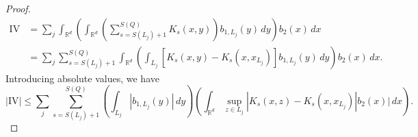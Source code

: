 \documentclass[12pt]{amsart}
\newcommand{\R}{\mathbb{R}}
\theoremstyle{plain}
\theoremstyle{definition} %
\numberwithin{equation}{section}
\begin{document}
\begin{proof}
    \begin{align*}    
    \mathrm{IV}
    &=   
    \sum_j \int_{\R^d}\left(\int_{\R^d}\left(
    \sum_{s=S(L_j)+1}^{S(Q)} K_s(x,y)
    \right)b_{1,L_j}(y)\, dy\right) b_2(x)\, dx
    \\&=
    \sum_{j}\sum_{s=S(L_j)+1}^{S(Q)} \int_{\R^d}\left(\int_{L_j}[K_s(x,y)-K_s(x,x_{L_j})]b_{1,L_j}(y)\, dy\right) b_2(x)\, dx.
    \end{align*}
    Introducing absolute values, we have
    \[
    |\mathrm{IV}|
    \leq 
    \sum_{j}
    \sum_{s=S(L_j)+1}^{S(Q)}
    \left(\int_{L_j}|b_{1,L_j}(y)|\, dy\right)\left(\int_{\R^d} \sup_{z\in L_j}|K_s(x,z)-K_s(x,x_{L_j})|b_2(x)|\, dx\right).
    \]
        

\end{proof}
\end{document}
